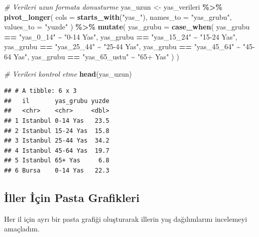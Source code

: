\documentclass[
]{article}
\newenvironment{Shaded}{\begin{snugshade}}{\end{snugshade}}
\newcommand{\AttributeTok}[1]{\textcolor[rgb]{0.13,0.29,0.53}{#1}}
\newcommand{\CommentTok}[1]{\textcolor[rgb]{0.56,0.35,0.01}{\textit{#1}}}
\newcommand{\FunctionTok}[1]{\textcolor[rgb]{0.13,0.29,0.53}{\textbf{#1}}}
\newcommand{\NormalTok}[1]{#1}
\newcommand{\OtherTok}[1]{\textcolor[rgb]{0.56,0.35,0.01}{#1}}
\newcommand{\SpecialCharTok}[1]{\textcolor[rgb]{0.81,0.36,0.00}{\textbf{#1}}}
\newcommand{\StringTok}[1]{\textcolor[rgb]{0.31,0.60,0.02}{#1}}
\begin{document}
\begin{Shaded}
\begin{Highlighting}[]
\CommentTok{\# Verileri uzun formata donusturme}
\NormalTok{yas\_uzun }\OtherTok{\textless{}{-}}\NormalTok{ yas\_verileri }\SpecialCharTok{\%\textgreater{}\%}
  \FunctionTok{pivot\_longer}\NormalTok{(}
    \AttributeTok{cols =} \FunctionTok{starts\_with}\NormalTok{(}\StringTok{"yas\_"}\NormalTok{),}
    \AttributeTok{names\_to =} \StringTok{"yas\_grubu"}\NormalTok{,}
    \AttributeTok{values\_to =} \StringTok{"yuzde"}
\NormalTok{  ) }\SpecialCharTok{\%\textgreater{}\%}
  \FunctionTok{mutate}\NormalTok{(}
    \AttributeTok{yas\_grubu =} \FunctionTok{case\_when}\NormalTok{(}
\NormalTok{      yas\_grubu }\SpecialCharTok{==} \StringTok{"yas\_0\_14"} \SpecialCharTok{\textasciitilde{}} \StringTok{"0{-}14 Yas"}\NormalTok{,}
\NormalTok{      yas\_grubu }\SpecialCharTok{==} \StringTok{"yas\_15\_24"} \SpecialCharTok{\textasciitilde{}} \StringTok{"15{-}24 Yas"}\NormalTok{,}
\NormalTok{      yas\_grubu }\SpecialCharTok{==} \StringTok{"yas\_25\_44"} \SpecialCharTok{\textasciitilde{}} \StringTok{"25{-}44 Yas"}\NormalTok{,}
\NormalTok{      yas\_grubu }\SpecialCharTok{==} \StringTok{"yas\_45\_64"} \SpecialCharTok{\textasciitilde{}} \StringTok{"45{-}64 Yas"}\NormalTok{,}
\NormalTok{      yas\_grubu }\SpecialCharTok{==} \StringTok{"yas\_65\_ustu"} \SpecialCharTok{\textasciitilde{}} \StringTok{"65+ Yas"}
\NormalTok{    )}
\NormalTok{  )}

\CommentTok{\# Verileri kontrol etme}
\FunctionTok{head}\NormalTok{(yas\_uzun)}
\end{Highlighting}
\end{Shaded}

\begin{verbatim}
## # A tibble: 6 x 3
##   il       yas_grubu yuzde
##   <chr>    <chr>     <dbl>
## 1 Istanbul 0-14 Yas   23.5
## 2 Istanbul 15-24 Yas  15.8
## 3 Istanbul 25-44 Yas  34.2
## 4 Istanbul 45-64 Yas  19.7
## 5 Istanbul 65+ Yas     6.8
## 6 Bursa    0-14 Yas   22.3
\end{verbatim}

\subsection{İller İçin Pasta
Grafikleri}\label{iller-iuxe7in-pasta-grafikleri}

Her il için ayrı bir pasta grafiği oluşturarak illerin yaş dağılımlarını
incelemeyi amaçladım.
\end{document}
